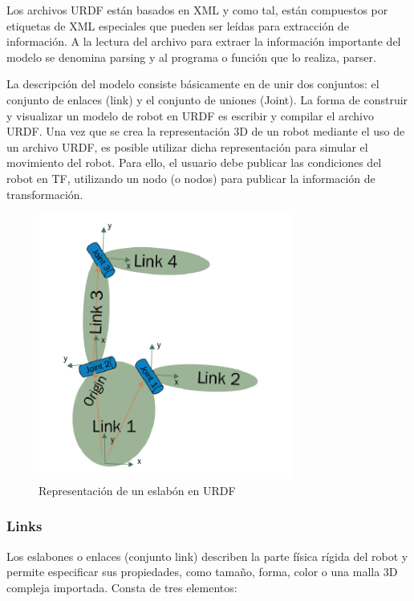         Los archivos URDF están basados en XML y como tal, están compuestos por etiquetas de XML especiales que pueden ser leídas para extracción de información. A la lectura del archivo para extraer la información importante del modelo se denomina parsing y al programa o función que lo realiza, parser.
        
        La descripción del modelo consiste básicamente en de unir dos conjuntos: el conjunto de enlaces (link) y el conjunto de uniones (Joint). La forma de construir y visualizar un modelo de robot en URDF es escribir y compilar el archivo URDF. Una vez que se crea la representación 3D de un robot mediante el uso de un archivo URDF, es posible utilizar dicha representación para simular el movimiento del robot. Para ello, el usuario debe publicar las condiciones del robot en TF, utilizando un nodo (o nodos) para publicar la información de transformación.
        
        \begin{figure}[htb]
            \centering
            \includegraphics[width=0.5\linewidth]{Main/Chapter3/Images3/3-7/representacion-de-eslabon-en-urdf.png}
            \caption{Representación de un eslabón en URDF}
            \label{f:Cap3-7_eslabon_urdf}
        \end{figure} 
        
                                \newpage

        
        \subsubsection{Links}
        
        Los eslabones o enlaces (conjunto link) describen la parte física rígida del robot y permite especificar sus propiedades, como tamaño, forma, color o una malla 3D compleja importada. Consta de tres elementos:
    
